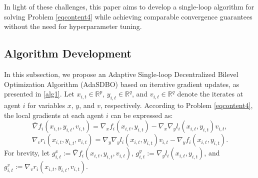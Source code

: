 \documentclass{article}
\theoremstyle{plain}
\theoremstyle{definition}
\theoremstyle{remark}
\begin{document}
In light of these challenges, this paper aims to develop a single-loop algorithm for solving Problem \eqref{eqcontent4} while achieving comparable convergence guarantees without the need for hyperparameter tuning.

\subsection{Algorithm Development}

In this subsection, we propose an { Ada}ptive { S}ingle-loop { D}ecentralized {B}ilevel { O}ptimization Algorithm (AdaSDBO) based on iterative gradient updates, as presented in \cref{alg1}. Let \(x_{i,t} \in \mathbb{R}^p\), \(y_{i,t} \in \mathbb{R}^q\), and \(v_{i,t} \in \mathbb{R}^q\) denote the iterates at agent $i$ for variables $x$, $y$, and $v$, respectively. According to Problem \eqref{eqcontent4}, the local gradients at each agent $i$ can be expressed as:
\begin{equation*}
\bar{\nabla}f_i(x_{i,t}, y_{i,t}, v_{i,t}) = \nabla_{x} f_i(x_{i,t}, y_{i,t}) - \nabla_{x}\nabla_{y} l_i(x_{i,t}, y_{i,t}) v_{i,t},
\end{equation*}
\begin{equation*}
    \nabla_{v} r_i(x_{i,t}, y_{i,t}, v_{i,t}) = \nabla_{y}\nabla_{y} l_i(x_{i,t}, y_{i,t}) v_{i,t} -\nabla_{y} f_i(x_{i,t}, y_{i,t}).
\end{equation*}
For brevity, let $g^x_{i,t}:=\bar{\nabla}f_i(x_{i,t}, y_{i,t}, v_{i,t})$, $g^y_{i,t} := \nabla_yl_i(x_{i,t}, y_{i,t})$, and $g^v_{i,t}:=\nabla_v r_i(x_{i,t}, y_{i,t}, v_{i,t})$.
\end{document}
